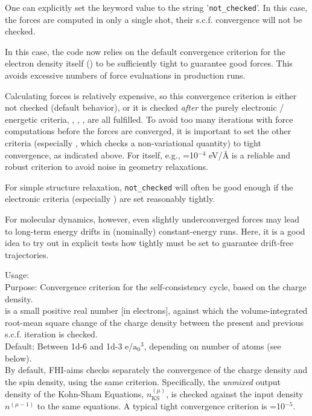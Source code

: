 One can explicitly set the keyword value to the string
'\texttt{not\_checked}'. In this case, the forces are computed in only
a single shot, their s.c.f. convergence will not be checked.

In this case, the code now relies on the default convergence criterion for
the electron density itself () to be sufficiently
tight to guarantee good forces. This avoids excessive numbers of force
evaluations in production runs.

Calculating forces is relatively expensive, so this convergence
criterion is either not checked (default behavior), or it
is checked \emph{after} the purely electronic /
energetic criteria, ,
, , are all
fulfilled. To avoid too many iterations with force computations before
the forces are converged, it is important to set the other criteria
(especially , which checks a
non-variational quantity) to tight convergence, as indicated
above. For  itself, e.g.,
=10$^{-4}$ eV/{\AA} is a reliable and robust criterion
to avoid noise in geometry relaxations.

For simple structure relaxation, \texttt{not\_checked} will often be
good enough if the electronic criteria (especially
) are set reasonably tightly.

For molecular
dynamics, however, even slightly underconverged forces may lead to
long-term energy drifts in (nominally) constant-energy runs. Here, it
is a good idea to try out in explicit tests how tightly
 must be set to guarantee drift-free
trajectories.

{
  \noindent
  Usage:   \\[1.0ex]
  Purpose: Convergence criterion for the self-consistency cycle, based
    on the charge density. \\[1.0ex]
   is a small positive real number [in electrons],
  against which the volume-integrated root-mean square change of the
  charge density between the present and previous s.c.f. iteration is
  checked. \\[1.0ex]
  Default: Between 1d-6 and 1d-3 e/$\text{a}_{0}{}^{3}$, depending on number of atoms (see below). \\
}
By default, FHI-aims checks separately the convergence of the charge
density and the spin density, using the same criterion. Specifically,
the \emph{unmixed} output density of the Kohn-Sham Equations,
$n_\text{KS}^{(\mu)}$, is checked against the input density
$n^{(\mu-1)}$ to the same equations. A typical tight convergence
criterion is =10$^{-5}$.

